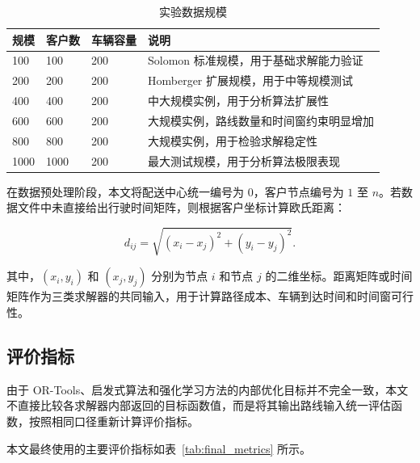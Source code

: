 \documentclass[12pt,a4paper,UTF8]{article}
\begin{document}
\begin{table}[!htbp]
    \centering
    \caption{实验数据规模}
    \label{tab:dataset_scale_simple}
    \small
    \begin{tabularx}{\textwidth}{p{2.5cm} p{2.8cm} p{2.8cm} X}
        \toprule
        规模 & 客户数 & 车辆容量 & 说明 \\
        \midrule
        100 & 100 & 200 & Solomon 标准规模，用于基础求解能力验证 \\
        200 & 200 & 200 & Homberger 扩展规模，用于中等规模测试 \\
        400 & 400 & 200 & 中大规模实例，用于分析算法扩展性 \\
        600 & 600 & 200 & 大规模实例，路线数量和时间窗约束明显增加 \\
        800 & 800 & 200 & 大规模实例，用于检验求解稳定性 \\
        1000 & 1000 & 200 & 最大测试规模，用于分析算法极限表现 \\
        \bottomrule
    \end{tabularx}
\end{table}

在数据预处理阶段，本文将配送中心统一编号为 $0$，客户节点编号为 $1$ 至 $n$。若数据文件中未直接给出行驶时间矩阵，则根据客户坐标计算欧氏距离：

\begin{equation}
    d_{ij}
    =
    \sqrt{(x_i-x_j)^2+(y_i-y_j)^2}.
    \label{eq:dataset_distance_simple}
\end{equation}

其中，$(x_i,y_i)$ 和 $(x_j,y_j)$ 分别为节点 $i$ 和节点 $j$ 的二维坐标。距离矩阵或时间矩阵作为三类求解器的共同输入，用于计算路径成本、车辆到达时间和时间窗可行性。

\subsection{评价指标}

由于 OR-Tools、启发式算法和强化学习方法的内部优化目标并不完全一致，本文不直接比较各求解器内部返回的目标函数值，而是将其输出路线输入统一评估函数，按照相同口径重新计算评价指标。

本文最终使用的主要评价指标如表~\ref{tab:final_metrics} 所示。
\end{document}
